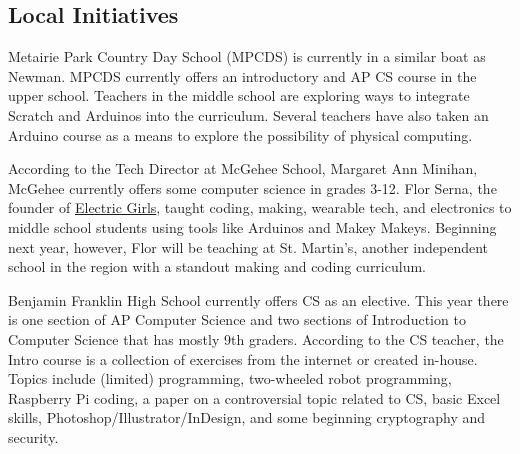 \subsection{Local Initiatives}
Metairie Park Country Day School (MPCDS) is currently in a similar boat as Newman. MPCDS currently offers an introductory and AP CS course in the upper school. Teachers in the middle school are exploring ways to integrate Scratch and Arduinos into the curriculum. Several teachers have also taken an Arduino course as a means to explore the possibility of physical computing.\par
According to the Tech Director at McGehee School, Margaret Ann Minihan, McGehee currently offers some computer science in grades 3-12. Flor Serna, the founder of \href{http://www.electricgirls.org/}{Electric Girls}, taught coding, making, wearable tech, and electronics to middle school students using tools like Arduinos and Makey Makeys. Beginning next year, however, Flor will be teaching at St. Martin's, another independent school in the region with a standout making and coding curriculum. 

Benjamin Franklin High School currently offers CS as an elective. This year there is one section of AP Computer Science and two sections of Introduction to Computer Science that has mostly 9th graders. According to the CS teacher, the Intro course is a collection of exercises from the internet or created in-house. Topics include (limited) programming, two-wheeled robot programming, Raspberry Pi coding, a paper on a controversial topic related to CS, basic Excel skills, Photoshop/Illustrator/InDesign, and some beginning cryptography and security.\par

